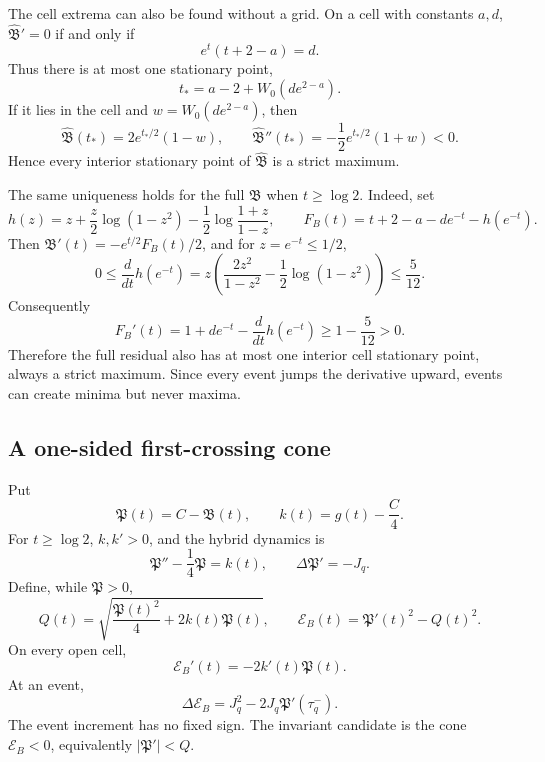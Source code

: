 \documentclass[11pt,a4paper]{article}
\numberwithin{equation}{section}
\theoremstyle{definition}
\newcommand{\Bres}{\mathfrak B}
\newcommand{\Bhat}{\widehat{\mathfrak B}}
\begin{document}
The cell extrema can also be found without a grid.  On a cell with constants
\(a,d\), \(\Bhat'=0\) if and only if
\[
  e^t(t+2-a)=d.
\]
Thus there is at most one stationary point,
\begin{equation}\label{eq:Bhat-Lambert-maximum}
  t_*=a-2+W_0(de^{2-a}).
\end{equation}
If it lies in the cell and \(w=W_0(de^{2-a})\), then
\[
  \Bhat(t_*)=2e^{t_*/2}(1-w),
  \qquad
  \Bhat''(t_*)=-\frac12e^{t_*/2}(1+w)<0.
\]
Hence every interior stationary point of \(\Bhat\) is a strict maximum.

The same uniqueness holds for the full \(\Bres\) when \(t\ge\log2\).  Indeed,
set
\[
  h(z)=z+\frac z2\log(1-z^2)
  -\frac12\log\frac{1+z}{1-z},
  \qquad
  F_B(t)=t+2-a-de^{-t}-h(e^{-t}).
\]
Then \(\Bres'(t)=-e^{t/2}F_B(t)/2\), and for \(z=e^{-t}\le1/2\),
\[
  0\le\frac{d}{dt}h(e^{-t})
  =z\left(\frac{2z^2}{1-z^2}
    -\frac12\log(1-z^2)\right)
  \le\frac5{12}.
\]
Consequently
\[
  F_B'(t)
  =1+de^{-t}-\frac{d}{dt}h(e^{-t})
  \ge1-\frac5{12}>0.
\]
Therefore the full residual also has at most one interior cell stationary
point, always a strict maximum.  Since every event jumps the derivative
upward, events can create minima but never maxima.

\subsection{A one-sided first-crossing cone}

Put
\begin{equation}\label{eq:Pcone-def}
  \mathfrak P(t)=C-\Bres(t),
  \qquad
  k(t)=g(t)-\frac C4.
\end{equation}
For \(t\ge\log2\), \(k,k'>0\), and the hybrid dynamics is
\begin{equation}\label{eq:Pcone-dynamics}
  \mathfrak P''-\frac14\mathfrak P=k(t),
  \qquad
  \Delta\mathfrak P'=-J_q.
\end{equation}
Define, while \(\mathfrak P>0\),
\begin{equation}\label{eq:cone-energy-radius}
  Q(t)=\sqrt{\frac{\mathfrak P(t)^2}{4}+2k(t)\mathfrak P(t)},
  \qquad
  \mathcal E_B(t)=\mathfrak P'(t)^2-Q(t)^2.
\end{equation}
On every open cell,
\begin{equation}\label{eq:cone-energy-flow}
  \boxed{
  \mathcal E_B'(t)=-2k'(t)\mathfrak P(t).
  }
\end{equation}
At an event,
\begin{equation}\label{eq:cone-energy-kick}
  \Delta\mathcal E_B
  =J_q^2-2J_q\mathfrak P'(\tau_q^-).
\end{equation}
The event increment has no fixed sign.  The invariant candidate is the cone
\(\mathcal E_B<0\), equivalently \(|\mathfrak P'|<Q\).
\end{document}
